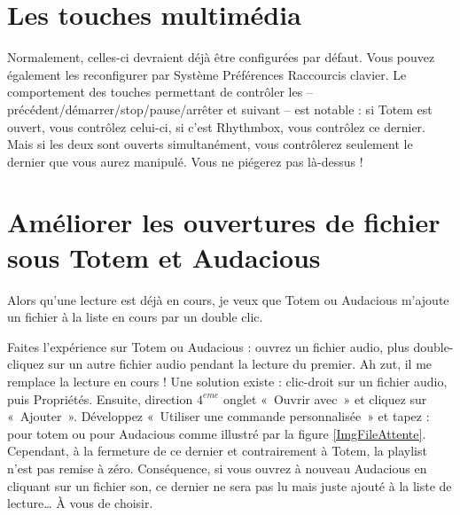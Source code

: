 \section{Les touches multimédia}
Normalement, celles-ci devraient déjà être configurées par défaut. Vous pouvez également les reconfigurer par Système \FlecheDroite Préférences \FlecheDroite Raccourcis clavier. Le comportement des touches permettant de contrôler les -- précédent/\IndicCesure{}démarrer/\IndicCesure{}stop/\IndicCesure{}pause/\IndicCesure{}arrêter et suivant -- est notable : si Totem est ouvert, vous contrôlez celui-ci, si c'est Rhythmbox, vous contrôlez ce dernier. Mais si les deux sont ouverts simultanément, vous contrôlerez seulement le dernier que vous aurez manipulé. Vous ne piégerez pas  là-dessus !
\section{Améliorer les ouvertures de fichier sous Totem et Audacious}
Alors qu'une lecture est déjà en cours, je veux que Totem ou Audacious m'ajoute un fichier à la liste en cours par un double clic.\par
{}
Faites l'expérience sur Totem ou Audacious : ouvrez un fichier audio, plus double-cliquez sur un autre fichier audio pendant la lecture du premier. Ah zut, il me remplace la lecture en cours ! Une solution existe : clic-droit sur un fichier audio, puis Propriétés. Ensuite, direction $4^{eme}$ onglet «~Ouvrir avec~» et cliquez sur «~Ajouter~». Développez «~Utiliser une commande personnalisée~» et tapez :  pour totem ou  pour Audacious comme illustré par la figure \ref{ImgFileAttente}. Cependant, à la fermeture de ce dernier et contrairement à Totem, la playlist n'est pas remise à zéro. Conséquence, si vous ouvrez à nouveau Audacious en cliquant sur un fichier son, ce dernier ne sera pas lu mais juste ajouté à la liste de lecture\ldots{} À vous de choisir.\par
